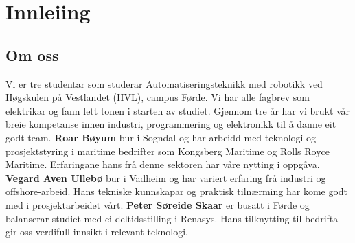 \chapter{Innleiing}
\thispagestyle{fancy}

\section{Om oss}
Vi er tre studentar som studerar Automatiseringsteknikk med robotikk ved Høgskulen på Vestlandet (\gls{HVL}), campus Førde.
Vi har alle fagbrev som elektrikar og fann lett tonen i starten av studiet. \newline
Gjennom tre år har vi brukt vår breie kompetanse innen industri, programmering og elektronikk
til å danne eit godt team.
\newline \newline
\textbf{Roar Bøyum} bur i Sogndal og har arbeidd med teknologi og prosjektstyring i maritime bedrifter som
Kongsberg Maritime og Rolls Royce Maritime. Erfaringane hans frå denne sektoren har våre nytting i oppgåva.
\newline \newline
\textbf{Vegard Aven Ullebø} bur i Vadheim og har variert erfaring frå industri og offshore-arbeid. 
Hans tekniske kunnskapar og praktisk tilnærming har kome godt med i prosjektarbeidet vårt. 
\newline \newline
\textbf{Peter Søreide Skaar} er busatt i Førde og balanserar studiet med ei deltidsstilling i Renasys. Hans tilknytting til bedrifta
gir oss verdifull innsikt i relevant teknologi. 

\newpage


